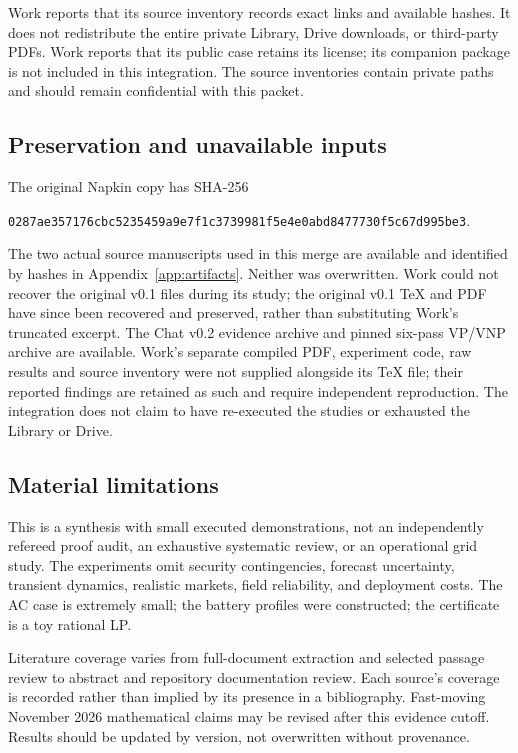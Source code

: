 \documentclass[11pt,letterpaper]{article}
\begin{document}
Work reports that its source inventory records exact links and available hashes. It does not redistribute the entire private Library, Drive downloads, or third-party PDFs. Work reports that its public case retains its license; its companion package is not included in this integration. The source inventories contain private paths and should remain confidential with this packet.

\subsection{Preservation and unavailable inputs}
The original Napkin copy has SHA-256\par\texttt{0287ae357176cbc5235459a9e7f1c37399}\newline\texttt{81f5e4e0abd8477730f5c67d995be3}.\par The two actual source manuscripts used in this merge are available and identified by hashes in Appendix~\ref{app:artifacts}. Neither was overwritten. Work could not recover the original v0.1 files during its study; the original v0.1 TeX and PDF have since been recovered and preserved, rather than substituting Work's truncated excerpt. The Chat v0.2 evidence archive and pinned six-pass VP/VNP archive are available. Work's separate compiled PDF, experiment code, raw results and source inventory were not supplied alongside its TeX file; their reported findings are retained as such and require independent reproduction. The integration does not claim to have re-executed the studies or exhausted the Library or Drive.

\subsection{Material limitations}
This is a synthesis with small executed demonstrations, not an independently refereed proof audit, an exhaustive systematic review, or an operational grid study. The experiments omit security contingencies, forecast uncertainty, transient dynamics, realistic markets, field reliability, and deployment costs. The AC case is extremely small; the battery profiles were constructed; the certificate is a toy rational LP.

Literature coverage varies from full-document extraction and selected passage review to abstract and repository documentation review. Each source's coverage is recorded rather than implied by its presence in a bibliography. Fast-moving November 2026 mathematical claims may be revised after this evidence cutoff. Results should be updated by version, not overwritten without provenance.
\end{document}
